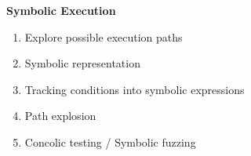 \begin{frame}
	\begin{columns}[t]
		\begin{column}{0.4\textwidth}
			\textbf{Symbolic Execution}
			\small
			\begin{enumerate}
				\item Explore possible execution paths
				\item Symbolic representation
                \item Tracking conditions into symbolic expressions
				\item Path explosion
				\item Concolic testing / Symbolic fuzzing
			\end{enumerate}
		\end{column}
	\end{columns}
\end{frame}
